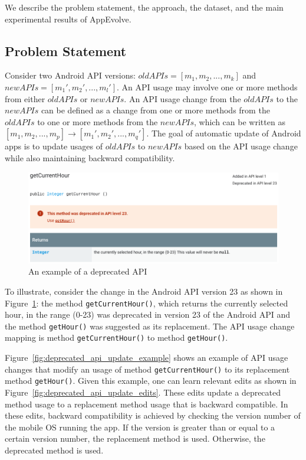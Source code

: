 We describe the problem statement, the approach, the dataset, and the main experimental results of AppEvolve.

\subsection{Problem Statement}
Consider two Android API versions: $oldAPIs = [m_1, m_2, ..., m_k]$ and $newAPIs = [m_1', m_2', ..., m_l']$. An API usage may involve one or more methods from either $oldAPIs$ or $newAPIs$. An API usage change from the $oldAPIs$ to the $newAPIs$ can be defined as a change from one or more methods from the $oldAPIs$ to one or more methods from the $newAPIs$, which can be written as $[m_1, m_2, ..., m_p] \rightarrow [m_1', m_2', ..., m_q']$. The goal of automatic update of Android apps is to update usages of $oldAPIs$ to $newAPIs$ based on the API usage change while also maintaining backward compatibility.

\begin{figure}[htb]
	\centering
	\includegraphics[width=0.8\linewidth]{deprecated-api-example.png}
	\caption{An example of a deprecated API
	}
	\label{fig:deprecated_api_example}
\end{figure}

To illustrate, consider the change in the Android API version 23 as shown in Figure~\ref{fig:deprecated_api_example}: the method \texttt{getCurrentHour()}, which returns the currently selected hour, in the range (0-23) was deprecated in version 23 of the Android API and the method \texttt{getHour()} was suggested as its replacement. The API usage change mapping is method \texttt{getCurrentHour()} to method \texttt{getHour()}.

Figure~\ref{fig:deprecated_api_update_example} shows an example of API usage changes that modify an usage of method \texttt{getCurrentHour()} to its replacement method \texttt{getHour()}. Given this example, one can learn relevant edits as shown in Figure~\ref{fig:deprecated_api_update_edits}. These edits update a deprecated method usage to a replacement method usage that is backward compatible. In these edits, backward compatibility is achieved by checking the version number of the mobile OS running the app. If the version is greater than or equal to a certain version number, the replacement method is used. Otherwise, the deprecated method is used.

